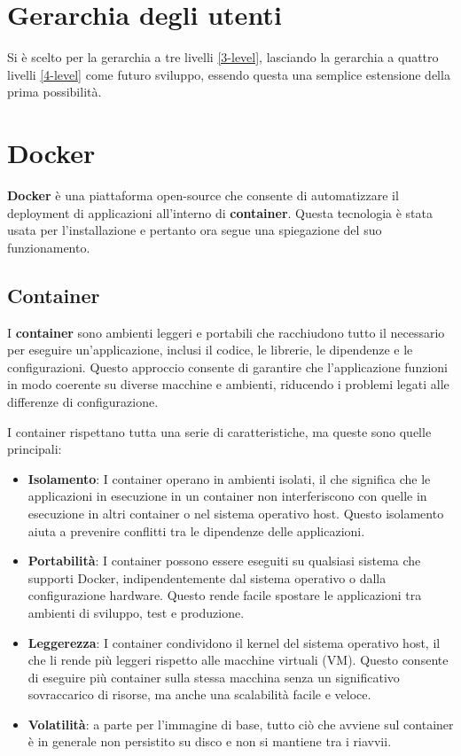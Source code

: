 \section{Gerarchia degli utenti}
Si è scelto per la gerarchia a tre livelli \ref{3-level}, lasciando la gerarchia a quattro livelli \ref{4-level} come futuro sviluppo, essendo questa una semplice estensione della prima possibilità.

\section{Docker}
\label{docker}
\textbf{Docker} \cite{docker} è una piattaforma open-source che consente di automatizzare il deployment di applicazioni all'interno di \textbf{container}. Questa tecnologia è stata usata per l'installazione e pertanto ora segue una spiegazione del suo funzionamento.

\subsection{Container}
I \textbf{container} sono ambienti leggeri e portabili che racchiudono tutto il necessario per eseguire un'applicazione, inclusi il codice, le librerie, le dipendenze e le configurazioni. Questo approccio consente di garantire che l'applicazione funzioni in modo coerente su diverse macchine e ambienti, riducendo i problemi legati alle differenze di configurazione.

I container rispettano tutta una serie di caratteristiche, ma queste sono quelle principali:
\begin{itemize}
    \item \textbf{Isolamento}: I container operano in ambienti isolati, il che significa che le applicazioni in esecuzione in un container non interferiscono con quelle in esecuzione in altri container o nel sistema operativo host. Questo isolamento aiuta a prevenire conflitti tra le dipendenze delle applicazioni.
    \item \textbf{Portabilità}: I container possono essere eseguiti su qualsiasi sistema che supporti Docker, indipendentemente dal sistema operativo o dalla configurazione hardware. Questo rende facile spostare le applicazioni tra ambienti di sviluppo, test e produzione.
    \item \textbf{Leggerezza}: I container condividono il kernel del sistema operativo host, il che li rende più leggeri rispetto alle macchine virtuali (VM). Questo consente di eseguire più container sulla stessa macchina senza un significativo sovraccarico di risorse, ma anche una scalabilità facile e veloce.
    \item \textbf{Volatilità}: a parte per l'immagine di base, tutto ciò che avviene sul container è in generale non persistito su disco e non si mantiene tra i riavvii.
\end{itemize}

